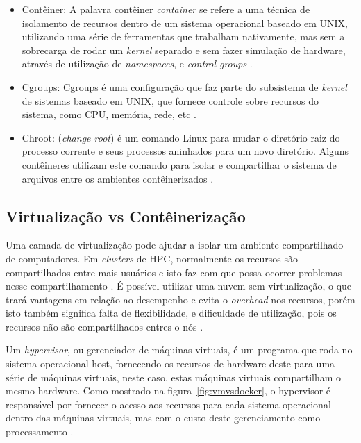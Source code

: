 \documentclass[twoside,english,brazilian]{UNISINOSartigo}
\begin{document}
\begin{itemize}
	\item Contêiner: A palavra contêiner \textit{container} se refere a uma técnica de isolamento de recursos dentro de um sistema operacional baseado em UNIX, utilizando uma série de ferramentas que trabalham nativamente, mas sem a sobrecarga de rodar um \textit{kernel} separado e sem fazer simulação de hardware, através de utilização de \textit{namespaces}, e \textit{control groups} \cite{LXC2016}.
	\item Cgroups: Cgroups é uma configuração que faz parte do subsistema de \textit{kernel} de sistemas baseado em UNIX, que fornece controle sobre recursos do sistema, como CPU, memória, rede, etc  \cite{NICKOLOFF2016}.
	\item Chroot: (\textit{change root}) é um comando Linux para mudar o diretório raiz do processo corrente e seus processos aninhados para um novo diretório. Alguns contêineres utilizam este comando para isolar e compartilhar o sistema de arquivos entre os ambientes contêinerizados \cite{Dua2014}. 
\end{itemize}

\subsection{Virtualização vs Contêinerização}
\label{virtualization}
Uma camada de virtualização pode ajudar a isolar um ambiente compartilhado de computadores. Em \textit{clusters} de HPC, normalmente os recursos são compartilhados entre mais usuários e isto faz com que possa ocorrer problemas nesse compartilhamento \cite{Xavier2013}. É possível utilizar uma nuvem sem virtualização, o que trará vantagens em relação ao desempenho e evita o \textit{overhead} nos recursos, porém isto também significa falta de flexibilidade, e dificuldade de utilização, pois os recursos não são compartilhados entres o nós \cite{Kominos2017}.

Um \textit{hypervisor}, ou gerenciador de máquinas virtuais, é um programa que roda no sistema operacional host, fornecendo os recursos de hardware deste para uma série de máquinas virtuais, neste caso, estas máquinas virtuais compartilham o mesmo hardware. Como mostrado na figura~\ref{fig:vmvsdocker}, o hypervisor é responsável por fornecer o acesso aos recursos para cada sistema operacional dentro das máquinas virtuais, mas com o custo deste gerenciamento como processamento \cite{Zhang2016}. 
\end{document}
